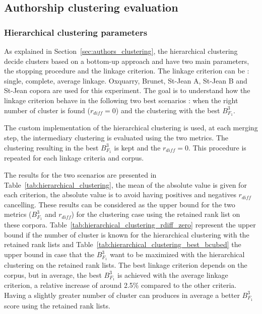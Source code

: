 \subsection{Authorship clustering evaluation}

\subsubsection{Hierarchical clustering parameters \label{sec:hierarchical_clustering}}

As explained in Section~\ref{sec:authors_clustering}, the hierarchical clustering decide clusters based on a bottom-up approach and have two main parameters, the stopping procedure and the linkage criterion.
The linkage criterion can be : single, complete, average linkage.
Oxquarry, Brunet, St-Jean A, St-Jean B and St-Jean copora are used for this experiment.
The goal is to understand how the linkage criterion behave in the following two best scenarios : when the right number of cluster is found ($r_{diff} = 0$) and the clustering with the best $B^3_{F_1}$.

The custom implementation of the hierarchical clustering is used, at each merging step, the intermediary clustering is evaluated using the two metrics.
The clustering resulting in the best $B^3_{F_1}$ is kept and the $r_{diff} = 0$.
This procedure is repeated for each linkage criteria and corpus.

The results for the two scenarios are presented in Table~\ref{tab:hierarchical_clustering}, the mean of the absolute value is given for each criterion, the absolute value is to avoid having positives and negatives $r_{diff}$ cancelling.
These results can be considered as the upper bound for the two metrics ($B^3_{F_1}$ and $r_{diff}$) for the clustering case using the retained rank list on these corpora.
Table~\ref{tab:hierarchical_clustering_rdiff_zero} represent the upper bound if the number of cluster is known for the hierarchical clustering with the retained rank lists and Table~\ref{tab:hierarchical_clustering_best_bcubed} the upper bound in case that the $B^3_{F_1}$ want to be maximized with the hierarchical clustering on the retained rank lists.
The best linkage criterion depends on the corpus, but in average, the best $B^3_{F_1}$ is achieved with the average linkage criterion, a relative increase of around 2.5\% compared to the other criteria.
Having a slightly greater number of cluster can produces in average a better $B^3_{F_1}$ score using the retained rank lists.

